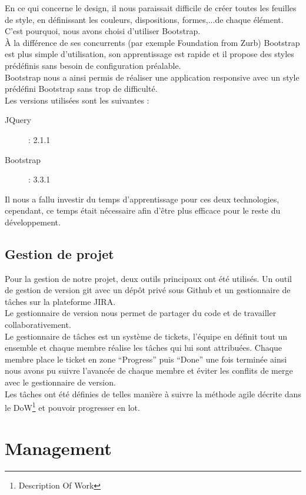 \documentclass{sigplanconf}
\begin{document}
En ce qui concerne le design, il nous paraissait difficile de créer toutes les feuilles de style, en définissant les couleurs, dispositions, formes,...de chaque élément. C'est pourquoi, nous avons choisi d’utiliser Bootstrap\cite{urlBootstrap}.\\
À la différence de ses concurrents (par exemple Foundation from Zurb) Bootstrap est plus simple d’utilisation, son apprentissage est rapide et il propose des styles prédéfinis sans besoin de configuration préalable.\\
Bootstrap nous a ainsi permis de réaliser une application responsive avec un style prédéfini Bootstrap sans trop de difficulté.\\
Les versions utilisées sont les suivantes :
\begin{description}
\item [JQuery] : 2.1.1
\item [Bootstrap] : 3.3.1
\end{description}

Il nous a fallu investir du temps d'apprentissage pour ces deux technologies, cependant, ce temps était nécessaire afin d'être plus efficace pour le reste du développement.

\subsection{Gestion de projet}
Pour la gestion de notre projet, deux outils principaux ont été utilisés. Un outil de gestion de version git avec un dépôt privé sous Github et un gestionnaire de tâches sur la plateforme JIRA.\\
Le gestionnaire de version nous permet de partager du code et de travailler collaborativement.\\
Le gestionnaire de tâches est un système de tickets, l’équipe en définit tout un ensemble et chaque membre réalise les tâches qui lui sont attribuées. Chaque membre place le ticket en zone “Progress” puis “Done” une fois terminée ainsi nous avons pu suivre l’avancée de chaque membre et éviter les conflits de merge avec le gestionnaire de version.\\
Les tâches ont été définies de telles manière à suivre la méthode agile décrite dans le DoW\footnote{Description Of Work} et pouvoir progresser en lot.

\section{Management}
\end{document}
